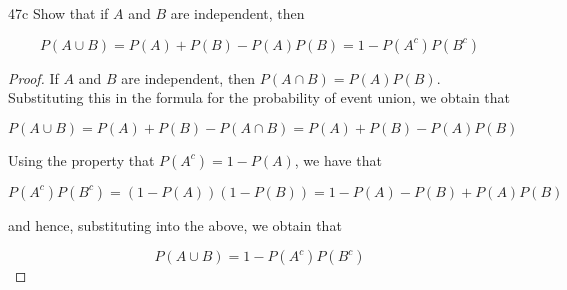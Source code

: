 \begin{exercise}{47c}
Show that if $A$ and $B$ are independent, then

$$P(A \cup B) = P(A) + P(B) - P(A)P(B) = 1 - P(A^c)P(B^c)$$
\end{exercise}

\begin{proof}
    If $A$ and $B$ are independent, then $P(A \cap B) = P(A)P(B)$. Substituting this in the formula for the probability of event union, we obtain that

    $$P(A \cup B) = P(A) + P(B) - P(A \cap B) =  P(A) + P(B) - P(A)P(B)$$

    Using the property that $P(A^c) = 1-P(A)$, we have that

    $$P(A^c)P(B^c) = (1-P(A))(1-P(B)) = 1 - P(A) - P(B) + P(A)P(B)$$

    and hence, substituting into the above, we obtain that 

    $$P(A \cup B) = 1 - P(A^c)P(B^c)$$
    
\end{proof}

\newpage

